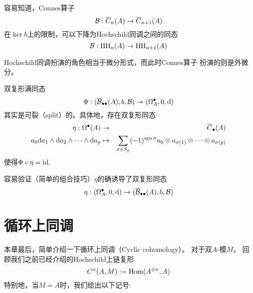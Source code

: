 








\begin{rem}
容易知道，Connes算子
$$\mathcal{B}:\overline{C}_n(A)\to\overline{C}_{n+1}(A)$$
在$\ker b$上的限制，可以下降为Hochschild同调之间的同态
$$\mathcal{B}:\operatorname{HH}_n(A)\to\operatorname{HH}_{n+1}(A)$$
\end{rem}
Hochschild同调扮演的角色相当于微分形式，而此时Connes算子
扮演的则是外微分。

\begin{rem}
双复形满同态
$$\Phi:(\overline{\mathcal{B}}_{\bullet\bullet}(A),b,\mathcal{B})\twoheadrightarrow
(\Omega^{\bullet}_A,0,\mathrm{d})
$$
其实是可裂（split）的。具体地，存在双复形同态
\begin{eqnarray*}
\eta:\Omega^{\bullet}(A)&\to&\overline{C}_{\bullet}(A)\\
a_0\mathrm{d} a_1\wedge\mathrm{d} a_2\wedge\cdots\wedge\mathrm{d} a_p
&\mapsto&\sum_{\sigma\in S_p}(-1)^{\operatorname{sgn} \sigma}
           a_0\otimes a_{\sigma(1)}\otimes\cdots\otimes a_{\sigma(p)}
\end{eqnarray*}
使得$\Phi\circ\eta=\operatorname{id}$.
\end{rem}

容易验证（简单的组合技巧）$\eta$的确诱导了双复形同态
$$\eta:(\Omega^{\bullet}_A,0,\mathrm{d})\to
(\overline{\mathcal{B}}_{\bullet\bullet}(A),b,\mathcal{B})
$$

\section{循环上同调}
本章最后，简单介绍一下循环上同调（Cyclic cohomology）。
对于双$A$-模$M$，
回顾我们之前已经介绍的Hochschild上链复形
$$C^n(A,M):=\operatorname{Hom}(A^{\otimes n},A)$$
特别地，当$M=A$时，我们给出以下记号:

